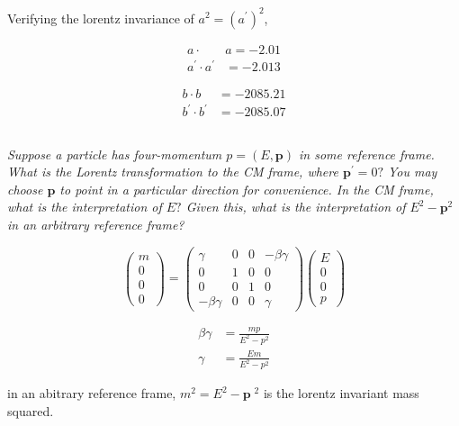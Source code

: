 \documentclass{article}
\begin{document}
Verifying the lorentz invariance of $a^2 = (a^\prime)^2$,

\begin{align*}
a \cdot &a=-2.01 \\
a^{\prime} \cdot a^{\prime}&=-2.013
\end{align*}

\begin{align*}
b \cdot b&=-2085.21 \\
b^{\prime} \cdot b^{\prime}&=-2085.07
\end{align*}


\subsection{}
\textit{Suppose a particle has four-momentum $p=(E, \mathbf{p})$ in some reference frame. What is the Lorentz transformation to the CM frame, where $\mathbf{p}^{\prime}=0 ?$ You may choose $\mathbf{p}$ to point in a particular direction for convenience. In the CM frame, what is the interpretation of $E ?$ Given this, what is the interpretation of $E^{2}-\mathbf{p}^{2}$ in an arbitrary reference frame?}

\begin{equation}
\left(\begin{array}{l}
m \\
0 \\
0 \\
0
\end{array}\right)=\left(\begin{array}{llll}
\gamma & 0 & 0 & -\beta \gamma \\
0 & 1 & 0 & 0 \\
0 & 0 & 1 & 0 \\
-\beta \gamma & 0 & 0 & \gamma
\end{array}\right)\left(\begin{array}{l}
E \\
0 \\
0 \\
p
\end{array}\right)
\end{equation}

\begin{align*}
\beta \gamma&=\frac{m p}{E^{2}-p^{2}} \\
\gamma&=\frac{E m}{E^{2}-p^{2}}
\end{align*}

in an abitrary reference frame, $m^{2}=E^{2}-\mathbf{p}\;^{2}$ is the lorentz invariant  mass squared.
\end{document}
